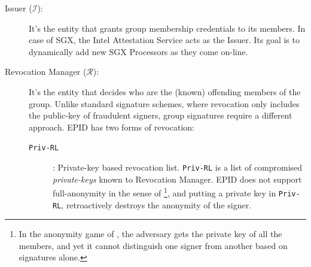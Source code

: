\documentclass[letterpaper]{article}
\begin{document}
  \begin{description}
  \item [Issuer ($\mathcal{I}$):] It's the entity that grants group
    membership credentials to its members. In case of SGX, the Intel
    Attestation Service acts as the Issuer. Its goal is to dynamically
    add new SGX Processors as they come on-line.

  \item[Revocation Manager ($\mathcal{R}$):] It's the entity that
    decides who are the (known) offending members of the group. Unlike
    standard signature schemes, where revocation only includes the
    public-key of fraudulent signers, group signatures require a
    different approach. EPID has two forms of revocation:

    \begin{description}
    \item[\texttt{Priv-RL}]: Private-key based revocation list.
      \texttt{Priv-RL} is a list of compromised \textit{private-keys}
      known to Revocation Manager. EPID does not support
      full-anonymity in the sense of \cite{BMW03}\footnote{In the
        \textsf{anonymity} game of \cite{BMW03}, the adversary gets
        the private key of all the members, and yet it cannot
        distinguish one signer from another based on signatures
        alone.}, and putting a private key in \texttt{Priv-RL},
      retroactively destroys the anonymity of the signer.
      


\end{description}
\end{description}
\end{document}
